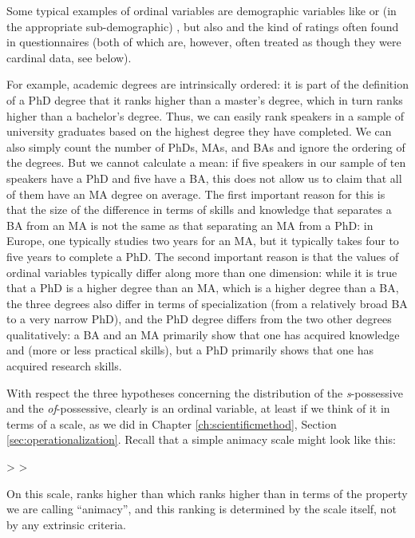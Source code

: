 Some typical examples of ordinal variables are demographic variables like  or (in the appropriate sub-demographic) , but also  and the kind of ratings often found in questionnaires (both of which are, however, often treated as though they were cardinal data, see below).

For example, academic degrees are intrinsically ordered: it is part of the definition of a PhD degree that it ranks higher than a master's degree, which in turn ranks higher than a bachelor's degree. Thus, we can easily rank speakers in a sample of university graduates based on the highest degree they have completed. We can also simply count the number of PhDs, MAs, and BAs and ignore the ordering of the degrees. But we cannot calculate a mean: if five speakers in our sample of ten speakers have a PhD and five have a BA, this does not allow us to claim that all of them have an MA degree on average. The first important reason for this is that the size of the difference in terms of skills and knowledge that separates a BA from an MA is not the same as that separating an MA from a PhD: in Europe, one typically studies two years for an MA, but it typically takes four to five years to complete a PhD. The second important reason is that the values of ordinal variables typically differ along more than one dimension: while it is true that a PhD is a higher degree than an MA, which is a higher degree than a BA, the three degrees also differ in terms of specialization (from a relatively broad BA to a very narrow PhD), and the PhD degree differs from the two other degrees qualitatively: a BA and an MA primarily show that one has acquired knowledge and (more or less practical skills), but a PhD primarily shows that one has acquired research skills.

With respect the three hypotheses concerning the distribution of the \textit{s}\hyp{}possessive and the \textit{of}-possessive, clearly  is an ordinal variable, at least if we think of it in terms of a scale, as we did in Chapter \ref{ch:scientificmethod}, Section \ref{sec:operationalization}. Recall that a simple animacy scale might look like this:

\begin{exe}
\ex {} >  > 
\label{ex:simpleanimacyscale}
\end{exe}

On this scale,  ranks higher than  which ranks higher than  in terms of the property we are calling ``animacy'', and this ranking is determined by the scale itself, not by any extrinsic criteria.

